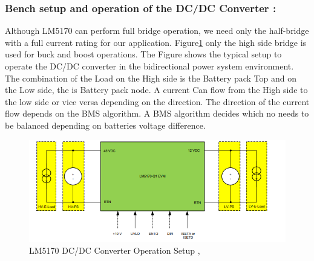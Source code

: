 \subsubsection{Bench setup and operation of the DC/DC Converter :}
Although LM5170 can perform full bridge operation, we need only the half-bridge with a full current rating for our application. Figure\ref{fig:LM5170_DC_DC_Converter_Operation_Setup} only the high side bridge is used for buck and boost operations. The Figure shows the typical setup to operate the DC/DC converter in the bidirectional power system environment. The combination of the Load on the High side is the Battery pack Top and on the Low side, the is Battery pack node.  A current Can flow from the High side to the low side or vice versa depending on the direction. The direction of the current flow depends on the BMS algorithm. A BMS algorithm decides which no needs to be balanced depending on batteries voltage difference. 
\begin{figure}[h]
	\centering
	\includegraphics[width=1\textwidth]{Chap04/Figures/DC_DC_Converter_bench_setup.PNG}
	\caption{LM5170 DC/DC Converter Operation Setup \cite{TI_LM5170_BatteryTesting_Solution},\cite{TI_LM5170_EVM_User_Guide} }
	\label{fig:LM5170_DC_DC_Converter_Operation_Setup}
\end{figure}


